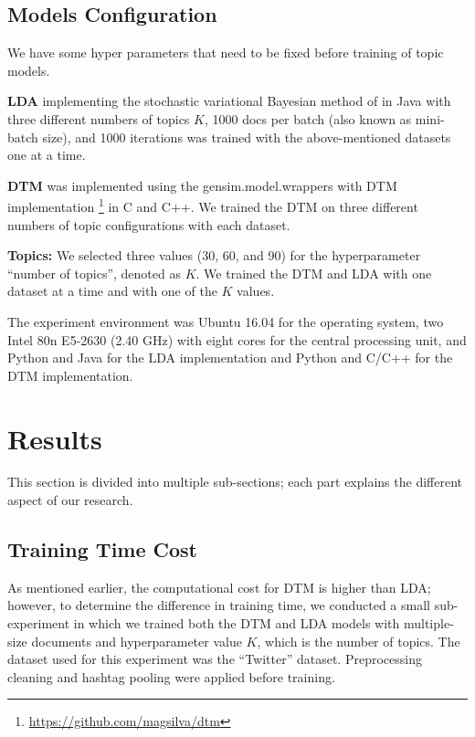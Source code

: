 \documentclass[a4paper]{report}
\begin{document}
\section{Models Configuration}
We have some hyper parameters that need to be fixed before training of topic models. 

\textbf{LDA} implementing the stochastic variational Bayesian method of \cite{mimno2012sparse} in Java with three different numbers of topics $K$, 1000 docs per batch (also known as mini-batch size), and 1000 iterations was trained with the above-mentioned datasets one at a time.

\textbf{DTM} was implemented using the gensim.model.wrappers with DTM implementation \footnote{\url{https://github.com/magsilva/dtm}} in C and C++. We trained the DTM on three different numbers of topic configurations with each dataset.

\textbf{Topics:} We selected three values (30, 60, and 90) for the hyperparameter ``number of topics'', denoted as $K$. We trained the DTM and LDA with one dataset at a time and with one of the $K$ values.

The experiment environment was Ubuntu 16.04 for the operating system, two Intel 80n E5-2630 (2.40 GHz) with eight cores for the central processing unit, and Python and Java for the LDA implementation and Python and C/C++ for the DTM implementation.


\chapter{Results}
This section is divided into multiple sub-sections; each part explains the different aspect of our research.

\section{Training Time Cost}
As mentioned earlier, the computational cost for DTM is higher than LDA;  however, to determine the difference in training time, we conducted a small sub-experiment in which we trained both the DTM and LDA models with multiple-size documents and hyperparameter value $K$, which is the number of topics. The dataset used for this experiment was the ``Twitter'' dataset. Preprocessing cleaning and hashtag pooling were applied before training.
\end{document}
